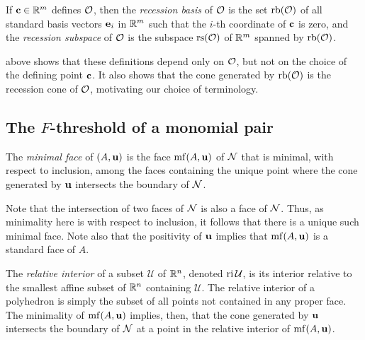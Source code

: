 \documentclass[11pt]{amsart}
\begin{document}
\begin{definition}
   If $\mathbf{c} \in \mathbb{R}^m$ defines $\mathcal{O}$, then the \emph{recession basis} of $\mathcal{O}$ is the set $\operatorname{rb}(\mathcal{O})$ of all standard basis vectors $\mathbf{e}_i$ in $\mathbb{R}^m$ such that the $i$-th coordinate of $\mathbf{c}$ is zero, and the \emph{recession subspace} of $\mathcal{O}$ is the subspace $\operatorname{rs}(\mathcal{O})$ of $\mathbb{R}^m$ spanned by $\operatorname{rb}(\mathcal{O})$.
\end{definition}

 above shows that these definitions depend only on $\mathcal{O}$, but not on the choice of the defining point $\mathbf{c}$.
It also shows that the cone generated by $\operatorname{rb}(\mathcal{O})$ is the recession cone of $\mathcal{O}$, motivating our choice of terminology.




\subsection{The $F$-threshold of a monomial pair}

\begin{definition}
   The \emph{minimal face} of $(A, \mathbf{u})$ is the face $\operatorname{mf}(A, \mathbf{u})$ of $\mathcal{N}$ that is minimal, with respect to inclusion, among the faces containing the unique point where the cone generated by $\mathbf{u}$ intersects the boundary of $\mathcal{N}$.
\end{definition}

Note that the intersection of two faces of $\mathcal{N}$ is also a face of $\mathcal{N}$.
Thus, as minimality here is with respect to inclusion, it follows that there is a unique such minimal face.
Note also that the positivity of $\mathbf{u}$ implies that $\operatorname{mf}(A,\mathbf{u})$ is a standard face of $A$.

The \emph{relative interior} of a subset $\mathcal{U}$ of $\mathbb{R}^n$, denoted $\operatorname{ri} \mathcal{U}$, is its interior relative to the smallest affine subset of $\mathbb{R}^n$ containing $\mathcal{U}$.
The relative interior of a polyhedron is simply the subset of all points not contained in any proper face.
The minimality of $\operatorname{mf}(A,\mathbf{u})$ implies, then, that the cone generated by $\mathbf{u}$ intersects the boundary of $\mathcal{N}$ at a point in the relative interior of $\operatorname{mf}(A,\mathbf{u})$.
\end{document}
